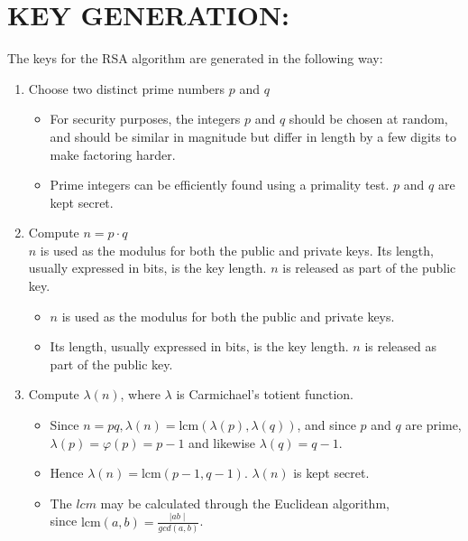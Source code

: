 \documentclass[12pt,fleqn]{article}
\begin{document}
\medskip{}


\section{KEY GENERATION:}

The keys for the RSA algorithm are generated in the following way:
\begin{enumerate}
\item Choose two distinct prime numbers $p$ and $q$
\begin{itemize}
\item For security purposes, the integers $p$ and $q$ should be chosen
at random, and should be similar in magnitude but differ in length
by a few digits to make factoring harder.
\item Prime integers can be efficiently found using a primality test. $p$
and $q$ are kept secret.
\end{itemize}
\item Compute $n = p\cdot q$\\ $n$ is used as the modulus for both the
public and private keys. Its length, usually expressed in bits, is
the key length. $n$ is released as part of the public key.
\begin{itemize}
\item $n$ is used as the modulus for both the public and private keys. 
\item Its length, usually expressed in bits, is the key length. $n$ is
released as part of the public key.
\end{itemize}
\item Compute $\lambda(n)$, where $\lambda$ is Carmichael's totient function. 
\begin{itemize}
\item Since $n = pq, \lambda(n) = \text{lcm}(\lambda(p),\lambda(q))$, and
since $p$ and $q$ are prime, $\lambda(p) = \varphi(p) = p − 1$
and likewise $\lambda(q) = q − 1$. 
\item Hence $\lambda(n) = \text{lcm}(p − 1, q − 1)$. $\lambda(n)$
is kept secret. 
\item The $lcm$ may be calculated through the Euclidean algorithm,\\ since
$\displaystyle \text{lcm}(a,b) = \frac{\mid ab \mid}{gcd(a,b)}$.
\end{itemize}
\end{enumerate}
\end{document}
